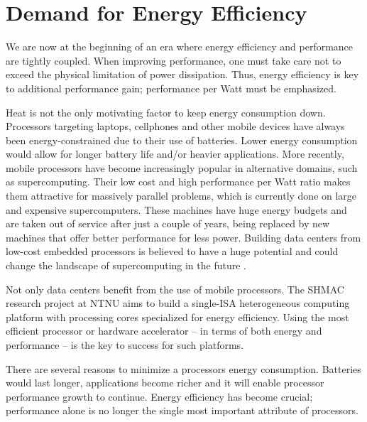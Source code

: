 \section{Demand for Energy Efficiency}

We are now at the beginning of an era where energy efficiency and performance
are tightly coupled. When improving performance, one must take care not to
exceed the physical limitation of power dissipation. Thus, energy efficiency is
key to additional performance gain; performance per Watt must be emphasized.

Heat is not the only motivating factor to keep energy consumption down.
Processors targeting laptops, cellphones and other mobile devices have always
been energy-constrained due to their use of batteries. Lower energy consumption
would allow for longer battery life and/or heavier applications. More recently,
mobile processors have become increasingly popular in alternative domains,
such as supercomputing. Their low cost and high performance per Watt ratio makes
them attractive for massively parallel problems, which is currently done on
large and expensive supercomputers. These machines have huge energy budgets and
are taken out of service after just a couple of years, being replaced by new
machines that offer better performance for less power. Building data centers
from low-cost embedded processors is believed to have a huge potential and
could change the landscape of supercomputing in the future
\cite{rajovic2013supercomputing}.

Not only data centers benefit from the use of mobile processors. The SHMAC
research project at NTNU aims to build a single-ISA heterogeneous computing
platform with processing cores specialized for energy efficiency. Using the most
efficient processor or hardware accelerator -- in terms of both energy and
performance -- is the key to success for such platforms.

There are several reasons to minimize a processors energy consumption. Batteries
would last longer, applications become richer and it will enable processor
performance growth to continue. Energy efficiency has become crucial;
performance alone is no longer the single most important attribute of
processors.

